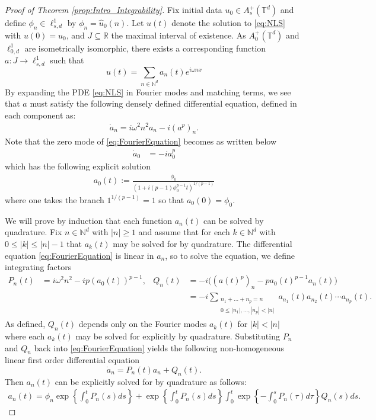 \documentclass{article}
\newcommand{\R}{\mathbb{R}}
\newcommand{\N}{\mathbb{N}}
\newcommand{\T}{\mathbb{T}}
\begin{document}
\begin{proof}[Proof of Theorem  \ref{prop:Intro_Integrability}]
	Fix initial data $ u_0 \in A^+_s(\T^d)$ and define $ \phi_n \in \ell_{s,d}^1$ by $ \phi_n = \hat{u}_0(n)$. 
	Let  $u(t)$  denote the solution to \eqref{eq:NLS} with $ u(0) = u_0$, and $J\subseteq \R$   the maximal interval of existence. 
	As $ A_0^+(\T^d)$ and $ \ell_{0,d}^1$ are isometrically isomorphic, there exists a corresponding function  $ a: J \to \ell^1_{s,d}$ such that  
	\[
	u(t) = \sum_{n \in \N^d} a_n(t) e^{i \omega n x}
	\]
	By expanding the PDE \eqref{eq:NLS} in Fourier modes and matching terms, we see that $a$ must satisfy the following densely defined differential equation, defined in each component as: 
	\begin{align}
	\label{eq:FourierEquation}
	\dot{a}_n =  i \omega^2 n^2 a_n - i (a^p)_n .
	\end{align}
	Note that the zero mode of  \eqref{eq:FourierEquation} becomes as written below  
		\begin{align*}
		\dot{a}_0  &= 	-i a_0^p
	\end{align*}
	which has the following explicit solution  
\begin{align}\label{eq:ZeroModeSolution}
	a_0(t) := \frac{\phi_0}{(1+ i(p-1) \phi_0^{p-1} t)^{1/(p-1)}}  
\end{align}
where one takes the branch $ 1^{1/(p-1)} = 1$ so that $ a_0(0) = \phi_0$.  


We will prove by induction that each function $a_n(t)$ can be solved by quadrature. 
Fix $n \in \N^d$ with $|n| \geq 1$ and assume that for each $ k \in \N^d$ with  $ 0 \leq |k|  \leq |n|-1$ that $a_k(t)$ may be solved for by quadrature. The differential equation \eqref{eq:FourierEquation}   is linear in $a_n$, so to solve the equation, we define integrating factors 
\begin{align*}
	P_n(t) &=  i \omega^2 n^2 -  i p (a_0(t))^{p-1}  , & 
	Q_n(t) &= -i\big(
	(a(t)^p)_n -  p a_0(t)^{p-1} a_n(t)   \big)\\
	&&
	&=- i 
	\sum_{
		\substack{n_1 + \dots + n_p = n  \\
			0 \leq 	|n_1|,\dots,|n_p| < |n|
	}}
	a_{n_1}(t)  a_{n_2}(t) \cdots 	 a_{n_p}(t) .
\end{align*}
As defined, $Q_n(t)$ depends only on the Fourier modes $a_k(t)$ for $ |k| < |n|$ where each $a_k(t)$ may be solved for explicitly by quadrature.  
Substituting $P_n$ and $Q_n$ back into  \eqref{eq:FourierEquation}  yields  the following non-homogeneous linear first order differential equation  
\[
\dot{a}_n =  P_n(t) a_n + Q_n(t).
\]
	Then $a_n(t)$ can be explicitly solved for by quadrature as follows: 
	\begin{align}
		\label{eq:ExplicitFormula}
		a_n(t) = 
		\phi_n \exp \left\{  \int_0^t P_n(s) ds \right\} 
		+
		\exp \left\{  \int_0^t P_n(s) ds \right\} 
		\int_0^t \exp \left\{ - \int_0^s P_n(\tau) d \tau \right\} 
		Q_n(s)  ds .
	\end{align}		

	
	
\end{proof}
\end{document}
